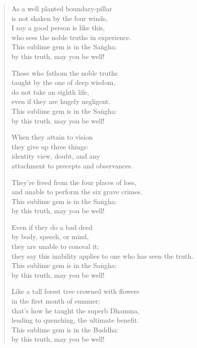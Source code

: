 \documentclass[12pt,openany]{book}%
\begin{document}
\begin{verse}
As a well planted boundary-pillar \\
is not shaken by the four winds, \\
I say a good person is like this, \\
who sees the noble truths in experience. \\
This sublime gem is in the \textsanskrit{Saṅgha}: \\
by this truth, may you be well! 

Those who fathom the noble truths \\
taught by the one of deep wisdom, \\
do not take an eighth life, \\
even if they are hugely negligent. \\
This sublime gem is in the \textsanskrit{Saṅgha}: \\
by this truth, may you be well! 

When they attain to vision \\
they give up three things: \\
identity view, doubt, and any \\
attachment to precepts and observances. 

They’re freed from the four places of loss, \\
and unable to perform the six grave crimes. \\
This sublime gem is in the \textsanskrit{Saṅgha}: \\
by this truth, may you be well! 

Even if they do a bad deed \\
by body, speech, or mind, \\
they are unable to conceal it; \\
they say this inability applies to one who has seen the truth. \\
This sublime gem is in the \textsanskrit{Saṅgha}: \\
by this truth, may you be well! 

Like a tall forest tree crowned with flowers \\
in the first month of summer; \\
that’s how he taught the superb Dhamma, \\
leading to quenching, the ultimate benefit. \\
This sublime gem is in the Buddha: \\
by this truth, may you be well! 


\end{verse}
\end{document}
